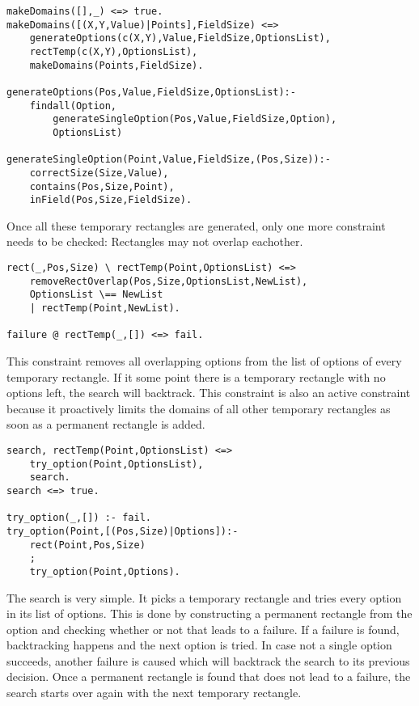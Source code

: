 \begin{lstlisting}
makeDomains([],_) <=> true.
makeDomains([(X,Y,Value)|Points],FieldSize) <=>
	generateOptions(c(X,Y),Value,FieldSize,OptionsList),
	rectTemp(c(X,Y),OptionsList),
	makeDomains(Points,FieldSize).
	
generateOptions(Pos,Value,FieldSize,OptionsList):-
    findall(Option,
		generateSingleOption(Pos,Value,FieldSize,Option),
		OptionsList)
		
generateSingleOption(Point,Value,FieldSize,(Pos,Size)):-
	correctSize(Size,Value),
	contains(Pos,Size,Point),
	inField(Pos,Size,FieldSize).
\end{lstlisting}

Once all these temporary rectangles are generated, only one more constraint needs to be checked: Rectangles may not overlap eachother.

\begin{lstlisting}
rect(_,Pos,Size) \ rectTemp(Point,OptionsList) <=>
	removeRectOverlap(Pos,Size,OptionsList,NewList),
	OptionsList \== NewList
	| rectTemp(Point,NewList).
	
failure @ rectTemp(_,[]) <=> fail.

\end{lstlisting}


This constraint removes all overlapping options from the list of options of every temporary rectangle. If it some point there is a temporary rectangle with no options left, the search will backtrack. This constraint is also an active constraint because it proactively limits the domains of all other temporary rectangles as soon as a permanent rectangle is added.
\begin{lstlisting}
search, rectTemp(Point,OptionsList) <=>
	try_option(Point,OptionsList),
	search.
search <=> true.

try_option(_,[]) :- fail.
try_option(Point,[(Pos,Size)|Options]):-
    rect(Point,Pos,Size)
    ;
    try_option(Point,Options).
\end{lstlisting}

The search is very simple. It picks a temporary rectangle and tries every option in its list of options. This is done by constructing a permanent rectangle from the option and checking whether or not that leads to a failure. If a failure is found, backtracking happens and the next option is tried. In case not a single option succeeds, another failure is caused which will backtrack the search to its previous decision. Once a permanent rectangle is found that does not lead to a failure, the search starts over again with the next temporary rectangle.

